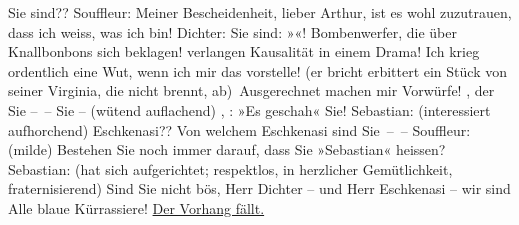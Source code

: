 					Sie sind??\pend
           \pstart
           Souffleur: Meiner Bescheiden\introOben{}heit\introOben{}, lieber Arthur, ist es
					wohl zuzutrauen, dass ich weiss, was ich bin!\pend
           \pstart
           Dichter: Sie sind: »\label{K_L01900_1v}\label{K_L01900_1h}«! Bombenwerfer, die über Knallbonbons sich beklagen!  verlangen Kausalität in einem Drama! Ich krieg
					ordentlich eine Wut, wenn ich mir das vorstelle! (er bricht erbittert ein Stück
					von seiner Virginia, die nicht brennt, ab) Ausgerechnet  machen mir Vorwürfe! {\pb}, der Sie – – Sie – (wütend auflachend) \so{Sie}, : »Es geschah«
					Sie!\pend
           \pstart
           Sebastian: (interessiert aufhorchend) Eschkenasi?? Von welchem Eschkenasi sind
					Sie – –\pend
           \pstart
           Souffleur: (milde) Bestehen Sie noch immer darauf, dass Sie  »Sebastian« heissen?\pend
           \pstart
           Sebastian: (hat sich aufgerichtet; respektlos, in herzlicher Gemütlichkeit,
					fraternisierend) Sind Sie nicht bös, Herr Dichter – und Herr Eschkenasi – wir
					sind Alle blaue Kürrassiere!\pend
           \pstart
           \centering{}\uline{Der Vorhang fällt.}\pend
           \endnumbering{}  
      
